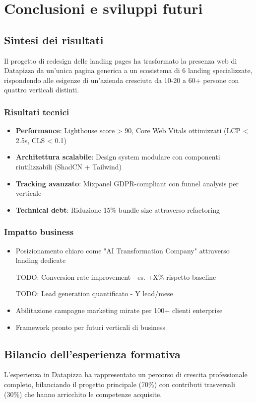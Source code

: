 \chapter{Conclusioni e sviluppi futuri}

\section{Sintesi dei risultati}
Il progetto di redesign delle landing pages ha trasformato la presenza web di Datapizza da un'unica pagina generica a un ecosistema di 6 landing specializzate, rispondendo alle esigenze di un'azienda cresciuta da 10-20 a 60+ persone con quattro verticali distinti.

\subsection{Risultati tecnici}
\begin{itemize}
  \item \textbf{Performance}: Lighthouse score > 90, Core Web Vitals ottimizzati (LCP < 2.5s, CLS < 0.1)
  \item \textbf{Architettura scalabile}: Design system modulare con componenti riutilizzabili (ShadCN + Tailwind)
  \item \textbf{Tracking avanzato}: Mixpanel GDPR-compliant con funnel analysis per verticale
  \item \textbf{Technical debt}: Riduzione 15\% bundle size attraverso refactoring
\end{itemize}

\subsection{Impatto business}
\begin{itemize}
  \item Posizionamento chiaro come "AI Transformation Company" attraverso landing dedicate
  \item [TODO: Conversion rate improvement - es. +X\% rispetto baseline]
  \item [TODO: Lead generation quantificato - Y lead/mese]
  \item Abilitazione campagne marketing mirate per 100+ clienti enterprise
  \item Framework pronto per futuri verticali di business
\end{itemize}

\section{Bilancio dell'esperienza formativa}
L'esperienza in Datapizza ha rappresentato un percorso di crescita professionale completo, bilanciando il progetto principale (70\%) con contributi trasversali (30\%) che hanno arricchito le competenze acquisite.

